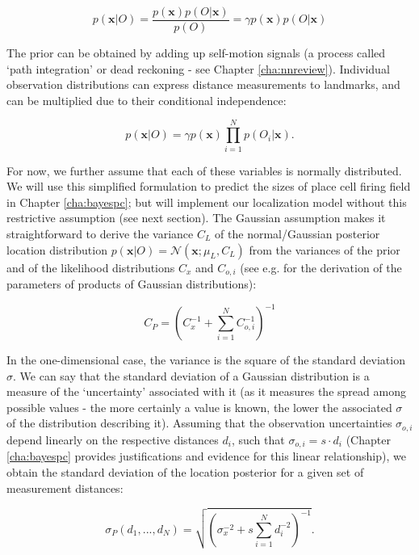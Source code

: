 \begin{equation}\label{bayes1}
p( \bm x | O ) = \frac{p( \bm x ) p( O | \bm x )}{p(O)} = \gamma p( \bm x ) p( O | \bm x )
\end{equation}

The prior can be obtained by adding up self-motion signals (a process called `path integration' or dead reckoning - see Chapter \ref{cha:nnreview}). Individual observation distributions can express distance measurements to landmarks, and can be multiplied due to their conditional independence:

\begin{equation}\label{bayes2}
p( \bm x | O ) = \gamma p( \bm x ) \prod_{i=1}^{N} p( O_i | \bm x ).
\end{equation}

For now, we further assume that each of these variables is normally distributed. We will use this simplified formulation to predict the sizes of place cell firing field in Chapter \ref{cha:bayespc}; but will implement our localization model without this restrictive assumption (see next section). The Gaussian assumption makes it straightforward to derive the variance $C_L$ of the normal/Gaussian posterior location distribution $p( \bm x | O ) = \mathcal{N}(\bm x ; \mu_L, C_L)$ from the variances of the prior and of the likelihood distributions $C_x$ and $C_{o,i}$ (see e.g. \cite{wu2004properties} for the derivation of the parameters of products of Gaussian distributions):

\begin{equation}\label{bayes3}
C_{P}=(C_x^{-1}+\sum_{i=1}^{N} C_{o,i}^{-1})^{-1}
\end{equation}

In the one-dimensional case, the variance is the square of the standard deviation $\sigma$. We can say that the standard deviation of a Gaussian distribution is a measure of the `uncertainty' associated with it (as it measures the spread among possible values - the more certainly a value is known, the lower the associated $\sigma$ of the distribution describing it). Assuming that the observation uncertainties $\sigma_{o,i}$ depend linearly on the respective distances $d_{i}$, such that $\sigma_{o,i}=s \cdot d_{i}$ (Chapter \ref{cha:bayespc} provides justifications and evidence for this linear relationship), we obtain the standard deviation of the location posterior for a given set of measurement distances:

\begin{equation}\label{bayes4}
\sigma_{P}(d_1, ..., d_N)=\sqrt{(\sigma_x^{-2}+s \sum_{i=1}^{N} d_{i}^{-2})^{-1}}.
\end{equation}

